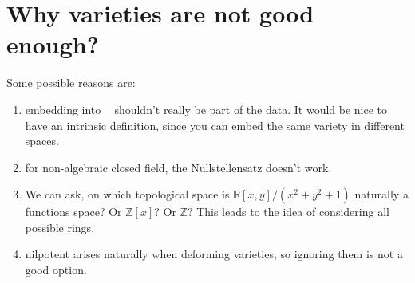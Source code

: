 \documentclass[12pt]{article} %
\DeclareMathOperator{\Aff}{\mathbb{A}^n}
\begin{document}
\section{Why varieties are not good enough?}
Some possible reasons are:
\begin{enumerate}
    \item embedding into $\Aff$ shouldn't really be part of the data. It would be nice
          to have an intrinsic definition, since you can embed the same variety in different spaces.
    \item for non-algebraic closed field, the Nullstellensatz doesn't work.
    \item We can ask, on which topological space is $\mathbb{R}[x,y]/(x^2+y^2+1)$ naturally a functions space? Or $\mathbb{Z}[x]$? Or $\mathbb{Z}$?
          This leads to the idea of considering all possible rings.
    \item nilpotent arises naturally when deforming varieties, so ignoring them is not a good option.
\end{enumerate}
\end{document}
